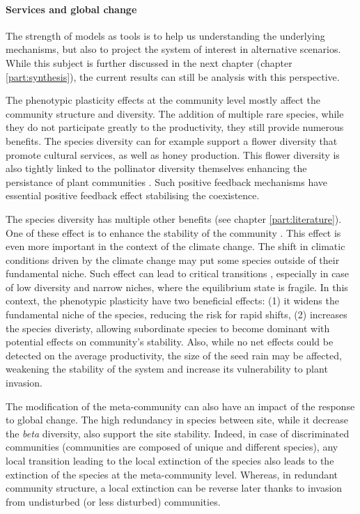 \paragraph{Services and global change}

The strength of models as tools is to help us understanding the underlying mechanisms, but also to project the system of interest in alternative scenarios. While this subject is further discussed in the next chapter (chapter \ref{part:synthesis}), the current results can still be analysis with this perspective.

The phenotypic plasticity effects at the community level mostly affect the community structure and diversity. The addition of multiple rare species, while they do not participate greatly to the productivity, they still provide numerous benefits. The species diversity can for example support a flower diversity that promote cultural services, as well as honey production. This flower diversity is also tightly linked to the pollinator diversity \parencite{frund_pollinator_2010} themselves enhancing the persistance of plant communities \parencite{fontaine_functional_2005}. Such positive feedback mechanisms have essential positive feedback effect stabilising the coexistence. 

The species diversity has multiple other benefits (see chapter \ref{part:literature})\parencite{tilman_diversity_2001}. One of these effect is to enhance the stability of the community \parencite{morin_temporal_2014}. This effect is even more important in the context of the climate change. The shift in climatic conditions driven by the climate change may put some species outside of their fundamental niche. Such effect can lead to critical transitions \parencite{scheffer_catastrophic_2001}, especially in case of low diversity and narrow niches, where the equilibrium state is fragile. In this context, the phenotypic plasticity have two beneficial effects: (1) it widens the fundamental niche of the species, reducing the risk for rapid shifts, (2) increases the species diveristy, allowing subordinate species to become dominant \parencite{adler_climate_2006} with potential effects on community's stability. Also, while no net effects could be detected on the average productivity, the size of the seed rain may be affected, weakening the stability of the system and increase its vulnerability to plant invasion.

The modification of the meta-community can also have an impact of the response to global change. The high redundancy in species between site, while it decrease the \textit{beta} diversity, also support the site stability. Indeed, in case of discriminated communities (communities are composed of unique and different species), any local transition leading to the local extinction of the species also leads to the extinction of the species at the meta-community level. Whereas, in redundant community structure, a local extinction can be reverse later thanks to invasion from undisturbed (or less disturbed) communities.

